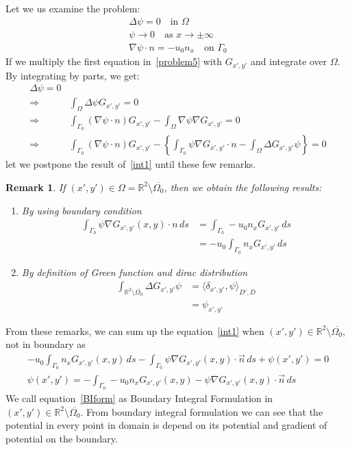 \documentclass[a4paper,12pt]{article}
\newtheorem{remark}{Remark}
\newcommand{\integ}[3]{%
\ensuremath{\displaystyle{\int^{#2}_{#1} #3}}}
\begin{document}
Let we us examine the problem:
\begin{align}  \label{problem5}
\Delta \psi=0 \quad \text{in } \Omega\\
\psi \to 0 \quad \text{as } x\to\pm\infty\\
\nabla\psi \cdot n = -u_0 n_x \quad \text{on } \Gamma_0 
\end{align}
If we multiply the first equation in~\eqref{problem5} with $G_{x',y'}$ and integrate over 
$\Omega$. By integrating by parts, we get:
\begin{align}
\Delta\psi=0\\
\Rightarrow&\integ{\Omega}{}{ \Delta \psi G_{x',y'}}=0\\
\Rightarrow& \integ{\Gamma_0}{}{(\nabla \psi \cdot n)G_{x',y'}}-\integ{\Omega}{}
{\nabla\psi \nabla G_{x',y'}}=0\\
\Rightarrow&\integ{\Gamma_0}{}{(\nabla \psi \cdot n)G_{x',y'}}-
\left\{\integ{\Gamma_0}{}{\psi \nabla G_{x',y'}\cdot n}-
\integ{\Omega}{}{\Delta G_{x',y'} \psi}\right\}=0 \label{int1}
\end{align}
let we postpone the result of~\eqref{int1} until these few remarks.
\begin{remark}
 If $(x',y')\in \Omega=\mathbb{R}^2 \setminus\overline{\Omega_0}$, then we obtain the following results:
\begin{enumerate}
 \item By using boundary condition
\begin{align}
 \integ{\Gamma_0}{}{\psi \nabla G_{x',y'}(x,y)\cdot n \, ds}&=\integ{\Gamma_0}{}{-u_0 n_x G_{x',y'} \, ds}\\
&= -u_0 \integ{\Gamma_0}{}{n_x G_{x',y'} \, ds}
\end{align}
\item By definition of Green function and dirac distribution
\begin{align}
 \integ{\mathbb{R}^2 \setminus \overline{\Omega_0}}{}{\Delta G_{x',y'} \psi }&=
{\langle\delta_{x',y'}{,} \psi\rangle}_{D',D}\\
&=\psi_{x',y'}
\end{align}
\end{enumerate}
\end{remark}
From these remarks, we can sum up the equation~\eqref{int1} 
when $(x',y')\in\mathbb{R}^2\setminus\overline{\Omega_0}$, not in boundary as
\begin{align}
 -u_0 \integ{\Gamma_0}{}{n_x G_{x',y'}(x,y) \, ds}-
\integ{\Gamma_0}{}{\psi\nabla G_{x',y'}(x,y)\cdot \vec{n} \, ds}+\psi(x',y')=0\\
\psi(x',y')=-\integ{\Gamma_0}{}{-u_0 n_x G_{x',y'}(x,y) -\psi\nabla G_{x',y'}(x,y)\cdot \vec{n} \, ds} \label{BIform}
\end{align}
We call equation~\eqref{BIform} as Boundary Integral Formulation in $(x',y')\in \mathbb{R}^2\setminus\overline{\Omega_0}$. From boundary integral formulation we can see that the potential in 
every point in domain is depend on its potential and gradient of potential on the boundary.
\end{document}
